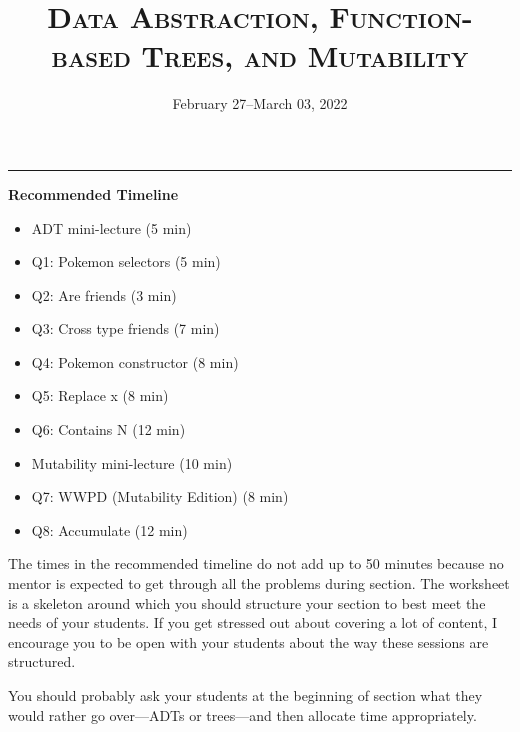 \documentclass{exam}
\title{\textsc{Data Abstraction, Function-based Trees, and Mutability}}
\date{February 27--March 03, 2022}
\begin{document}
\maketitle
\rule{\textwidth}{0.15em}
\fontsize{12}{15}\selectfont


\begin{meta}
\textbf{Recommended Timeline}
\begin{itemize}
    \item ADT mini-lecture (5 min)
    \item Q1: Pokemon selectors (5 min)
    \item Q2: Are friends (3 min)
    \item Q3: Cross type friends (7 min)
    \item Q4: Pokemon constructor (8 min)
    \item Q5: Replace x (8 min)
    \item Q6: Contains N (12 min)
    \item Mutability mini-lecture (10 min)
    \item Q7: WWPD (Mutability Edition) (8 min)
    \item Q8: Accumulate (12 min)
\end{itemize}
The times in the recommended timeline do not add up to 50 minutes because no mentor
is expected to get through all the problems during section. The worksheet is a skeleton
around which you should structure your section to best meet the needs of your students.
If you get stressed out about covering a lot of content, I encourage you to be open with
your students about the way these sessions are structured.  

You should probably ask your students at the beginning of section what they would rather go
over---ADTs or trees---and then allocate time appropriately. 
\end{meta}
\end{document}
